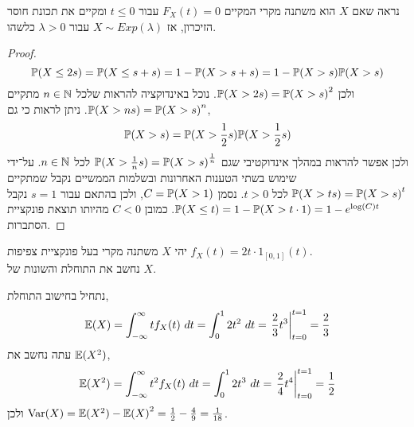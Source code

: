 \subquestion{}
נראה שאם $X$ הוא משתנה מקרי המקיים $F_X(t) = 0$ עבור $t \le 0$ ומקיים את תכונת חוסר הזיכרון, אז $X \sim Exp(\lambda)$ עבור $\lambda > 0$ כלשהו.
\begin{proof}
	\[
		\mathbb{P}(X \le 2s)
		= \mathbb{P}(X \le s + s)
		= 1 - \mathbb{P}(X > s + s)
		= 1 - \mathbb{P}(X > s) \mathbb{P}(X > s)
	\]
	ולכן $\mathbb{P}(X > 2s) = {\mathbb{P}(X > s)}^2$.
	נוכל באינדוקציה להראות שלכל $n \in \mathbb{N}$ מתקיים $\mathbb{P}(X > ns) = {\mathbb{P}(X > s)}^n$.
	ניתן לראות כי גם,
	\[
		\mathbb{P}(X > s)
		= \mathbb{P}(X > \frac{1}{2} s) \mathbb{P}(X > \frac{1}{2} s)
	\]
	ולכן אפשר להראות במהלך אינדוקטיבי שגם $\mathbb{P}(X > \frac{1}{n} s) = {\mathbb{P}(X > s)}^{\frac{1}{n}}$ לכל $n \in \mathbb{N}$.
	על־ידי שימוש בשתי הטענות האחרונות ובשלמות הממשיים נקבל שמתקיים $\mathbb{P}(X > t s) = {\mathbb{P}(X > s)}^t$ לכל $t > 0$.
	נסמן $C = \mathbb{P}(X > 1)$, ולכן בהתאם עבור $s = 1$ נקבל $\mathbb{P}(X \le t) = 1 - \mathbb{P}(X > t \cdot 1) = 1 - e^{\log(C) t}$.
	כמובן $C < 0$ מהיותו תוצאת פונקציית הסתברות.
\end{proof}

\question{}
יהי $X$ משתנה מקרי בעל פונקציית צפיפות $f_X(t) = 2t \cdot 1_{[0, 1]}(t)$. \\
נחשב את התוחלת והשונות של $X$.
\begin{solution}
	נתחיל בחישוב התוחלת,
	\[
		\mathbb{E}(X)
		= \int_{-\infty}^{\infty} t f_X(t)\ dt
		= \int_{0}^{1} 2t^2\ dt
		= \left. \frac{2}{3} t^3 \right\rvert_{t = 0}^{t = 1}
		= \frac{2}{3}
	\]
	עתה נחשב את  $\mathbb{E}(X^2)$,
	\[
		\mathbb{E}(X^2)
		= \int_{-\infty}^{\infty} t^2 f_X(t)\ dt
		= \int_{0}^{1} 2t^3\ dt
		= \left. \frac{2}{4} t^4 \right\rvert_{t = 0}^{t = 1}
		= \frac{1}{2}
	\]
	ולכן $\operatorname{Var}(X) = \mathbb{E}(X^2) - {\mathbb{E}(X)}^2 = \frac{1}{2} - \frac{4}{9} = \frac{1}{18}$.
\end{solution}


